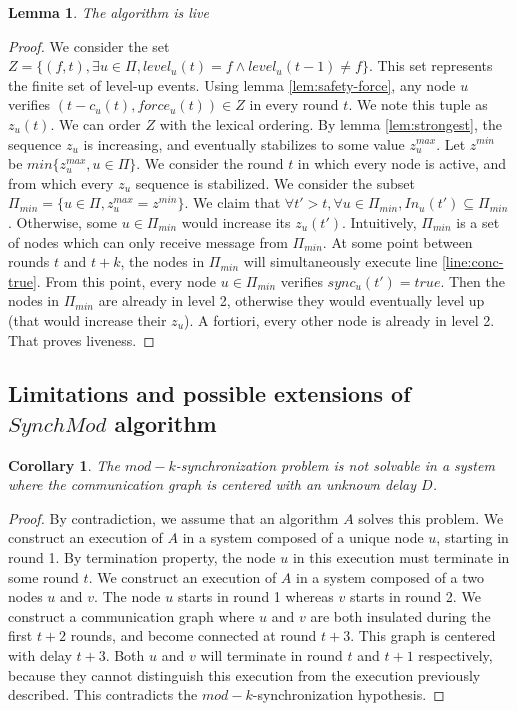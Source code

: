 \documentclass[11pt,letterpaper]{article}
\newtheorem{lem}[thm]{Lemma}
\newtheorem{cor}[thm]{Corollary}
\begin{document}
\begin{lem}
	The algorithm is live
\end{lem}
\begin{proof}
	We consider the set $Z = \{(f,t), \exists u \in \Pi, level_u(t) = f \wedge level_u(t-1) \neq f\}$.
	This set represents the finite set of level-up events.
	Using lemma \ref{lem:safety-force}, any node $u$ verifies $(t-c_u(t), force_u(t)) \in Z$ in every round $t$.
	We note this tuple as $z_u(t)$.
	We can order $Z$ with the lexical ordering.
	By lemma \ref{lem:strongest}, the sequence $z_u$ is increasing, and eventually stabilizes to some value $z_u^{max}$.
	Let $z^{min}$ be $min \{z_u^{max}, u \in \Pi\}$.
	We consider the round $t$ in which every node is active, and from which every $z_u$ sequence is stabilized.
	We consider the subset $\Pi_{min} = \{u \in \Pi, z_u^{max} = z^{min}\}$.
	We claim that $\forall t' > t, \forall u \in \Pi_{min}, In_u(t') \subseteq \Pi_{min}$.
	Otherwise, some $u \in \Pi_{min}$ would increase its $z_u(t')$.
	Intuitively, $\Pi_{min}$ is a set of nodes which can only receive message from $\Pi_{min}$.
	At some point between rounds $t$ and $t+k$, the nodes in $\Pi_{min}$ will simultaneously execute line \ref{line:conc-true}.
	From this point, every node $u \in \Pi_{min}$ verifies $sync_u(t') = true$.
	Then the nodes in $\Pi_{min}$ are already in level 2, otherwise they would eventually level up (that would increase their $z_u$).
	A fortiori, every other node is already in level 2.
	That proves liveness.
\end{proof}

\subsection{Limitations and possible extensions of $SynchMod$ algorithm}

\begin{cor}
	The $mod-k$-synchronization problem is not solvable in a system where the communication graph is centered with an unknown delay $D$.
\end{cor}
\begin{proof}
	By contradiction, we assume that an algorithm $A$ solves this problem.
	We construct an execution of $A$ in a system composed of a unique node $u$, starting in round 1.
	By termination property, the node $u$ in this execution must terminate in some round $t$.
	We construct an execution of $A$ in a system composed of a two nodes $u$ and $v$. The node $u$ starts in round 1 whereas $v$ starts in round 2.
	We construct a communication graph where $u$ and $v$ are both insulated during the first $t+2$ rounds, and become connected at round $t+3$.
	This graph is centered with delay $t+3$.
	Both $u$ and $v$ will terminate in round $t$ and $t+1$ respectively, because they cannot distinguish this execution from the execution previously described.
	This contradicts the $mod-k$-synchronization hypothesis.
\end{proof}
\end{document}
